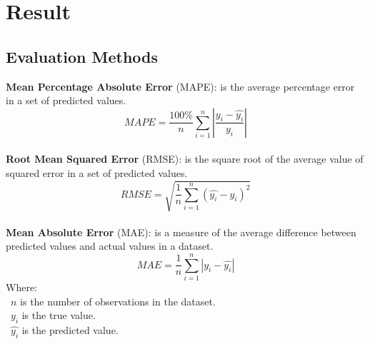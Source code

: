 \documentclass{ieeeojies}
\begin{document}
\section{Result}
\subsection{Evaluation Methods}
\textbf{Mean Percentage Absolute Error} (MAPE): is the average percentage error in a set of predicted values.\\
\[MAPE=\frac{100\%}{n}  \sum_{i=1}^{n} |\frac{y_i-\hat{y_i}}{y_i}|\]\\
\textbf{Root Mean Squared Error} (RMSE): is the square root of the average value of squared error in a set of predicted values.\\
\[RMSE=\sqrt{\frac{1}{n} \sum_{i=1}^{n}(\hat{y_i}-y_i )^2}\]\\
\textbf{Mean Absolute Error} (MAE): is a measure of the average difference between predicted values and actual values in a dataset.\\
\[MAE = \frac{1}{n} \sum_{i=1}^{n} |y_i - \hat{y_i}| \]
Where: \\
	\indent\textbullet\ \(n\) is the number of observations in the dataset.\\
	\indent\textbullet\ \(y_i\)  is the true value.\\
	\indent\textbullet\ \(\hat{y_i}\) is the predicted value.
        \cite{sefidian_guide}
\end{document}
